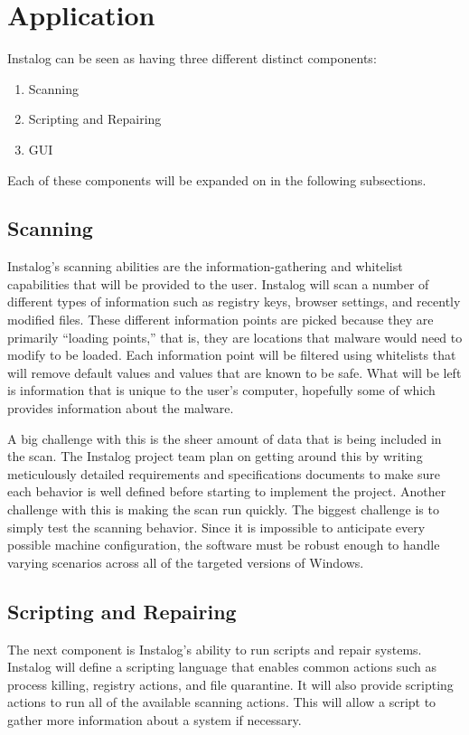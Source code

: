 \documentclass[letterpaper,12pt]{article}
\begin{document}
\newpage



\section{Application} \label{application}
Instalog can be seen as having three different distinct components:

\begin{enumerate}
  \item Scanning
  \item Scripting and Repairing
  \item GUI
\end{enumerate}

Each of these components will be expanded on in the following subsections.

\subsection{Scanning}
Instalog's scanning abilities are the information-gathering and whitelist
capabilities that will be provided to the user.  Instalog will scan a number of
different types of information such as registry keys, browser settings, and
recently modified files.  These different information points are picked because
they are primarily ``loading points,'' that is, they are locations that malware
would need to modify to be loaded.  Each information point will be filtered
using whitelists that will remove default values and values that are known to be
safe.  What will be left is information that is unique to the user's computer,
hopefully some of which provides information about the malware.

A big challenge with this is the sheer amount of data that is being included in
the scan.  The Instalog project team plan on getting around this by writing
meticulously detailed requirements and specifications documents to make sure
each behavior is well defined before starting to implement the project.
Another challenge with this is making the scan run quickly.  The biggest
challenge is to simply test the scanning behavior.  Since it is impossible to
anticipate every possible machine configuration, the software must be robust
enough to handle varying scenarios across all of the targeted versions of
Windows.

\subsection{Scripting and Repairing}
The next component is Instalog's ability to run scripts and repair systems. 
Instalog will define a scripting language that enables common actions such as
process killing, registry actions, and file quarantine.  It will also provide
scripting actions to run all of the available scanning actions.  This will allow
a script to gather more information about a system if necessary.  
\end{document}
